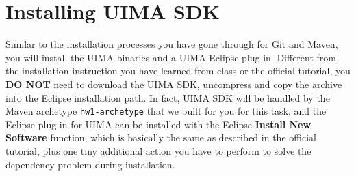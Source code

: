 
\section{Installing UIMA SDK}

Similar to the installation processes you have gone through for Git and Maven,
you will install the UIMA binaries and a UIMA Eclipse plug-in. Different from
the installation instruction you have learned from class or the official
tutorial, you \textbf{DO NOT} need to download the UIMA SDK, uncompress and copy
the archive into the Eclipse installation path. In fact, UIMA SDK will be
handled by the Maven archetype \verb|hw1-archetype| that we built for you for
this task, and the Eclipse plug-in for UIMA can be installed with the Eclipse
\textbf{Install New Software} function, which is basically the same as described
in the official tutorial, plus one tiny additional action you have to perform to
solve the dependency problem during installation.

